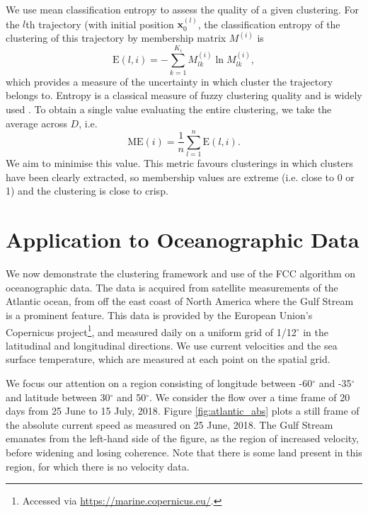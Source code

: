 \documentclass[a4paper, fontsize=12pt]{article}
\begin{document}
We use mean classification entropy to assess the quality of a given clustering. For the \(l\)th trajectory (with initial position \(\bm{x}_0^{(l)}\), the classification entropy of the clustering of this trajectory by membership matrix \(M^{(i)}\) is
\[
\mathrm{E}(l,i) = -\sum_{k=1}^{K_i}{M^{(i)}_{lk}\ln M^{(i)}_{lk}},
\]
which provides a measure of the uncertainty in which cluster the trajectory belongs to. Entropy is a classical measure of fuzzy clustering quality and is widely used \citep{dave_1995_fuzzyvalid}. To obtain a single value evaluating the entire clustering, we take the average across \(D\), i.e.
\begin{equation}
\mathrm{ME}(i) = \frac{1}{n}\sum_{l=1}^{n}{\mathrm{E}(l,i)}.
\label{eqn:ent}
\end{equation}
We aim to minimise this value. This metric favours clusterings in which clusters have been clearly extracted, so membership values are extreme (i.e. close to 0 or 1) and the clustering is close to crisp.



\section{Application to Oceanographic Data}

We now demonstrate the clustering framework and use of the FCC algorithm on oceanographic data. The data is acquired from satellite measurements of the Atlantic ocean, from off the east coast of North America where the Gulf Stream is a prominent feature. This data is provided by the European Union's Copernicus project\footnote{Accessed via \url{https://marine.copernicus.eu/}.}, and measured daily on a uniform grid of 1/12\(^{\circ}\) in the latitudinal and longitudinal directions. We use current velocities and the sea surface temperature, which are measured at each point on the spatial grid.

We focus our attention on a region consisting of longitude between -60\(^{\circ}\) and -35\(^{\circ}\) and latitude between 30\(^{\circ}\) and 50\(^{\circ}\). We consider the flow over a time frame of 20 days from 25 June to 15 July, 2018. Figure \ref{fig:atlantic_abs} plots a still frame of the absolute current speed as measured on 25 June, 2018. The Gulf Stream emanates from the left-hand side of the figure, as the region of increased velocity, before widening and losing coherence. Note that there is some land present in this region, for which there is no velocity data.
\end{document}
